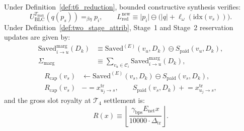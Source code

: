 \documentclass[runningheads,a4paper]{llncs}
\renewcommand{\_}{\textunderscore\allowbreak}
\begin{document}
Under Definition~\ref{def:t6_reduction}, bounded constructive synthesis verifies:
\begin{equation}
\label{eq:blc_synthesis}
U_{\text{BLC}}^{T_{\max}}(q(p_s)) =_{\beta\eta} p_i, \qquad
L_{\text{red}}^{\text{new}} \equiv \vert{}p_i\vert{} \ominus \big(\vert{}q\vert{} + \ell_\omega(\text{idx}(v_s))\big).
\end{equation}
Under Definition~\ref{def:two_stage_attrib}, Stage~1 and Stage~2 reservation updates are given by:
\begin{equation}
\label{eq:stage1_marg}
\begin{aligned}
\text{Saved}_{i \to u}^{\text{marg}}(D_k) &\equiv \text{Saved}^{(E)}(v_u, D_k) \ominus S_{\text{paid}}(v_u, D_k), \\
\Sigma_{\text{marg}} &\equiv \sum_{v_u \in \mathcal{C}_i} \text{Saved}_{i \to u}^{\text{marg}}(D_k),
\end{aligned}
\end{equation}
\begin{equation}
\label{eq:stage2_init_cap}
\begin{aligned}
R_{\text{cap}}(v_s) &\leftarrow \text{Saved}^{(E)}(v_s, D_k) \ominus S_{\text{paid}}(v_s, D_k), \\
R_{\text{cap}}(v_s) &\mathrel{-}= x_{u_j \to s}^{\text{tr}}, \qquad
S_{\text{paid}}(v_s, D_k) \mathrel{+}= x_{u_j \to s}^{\text{tr}},
\end{aligned}
\end{equation}
and the gross slot royalty at $\mathcal{T}_4$ settlement is:
\begin{equation}
\label{eq:slot_royalty}
R(x) \equiv \left\lfloor \frac{\gamma_{\text{bps}} E_{\text{net}} x}{10000 \cdot \Delta_{\text{tr}}} \right\rfloor.
\end{equation}
\end{document}
